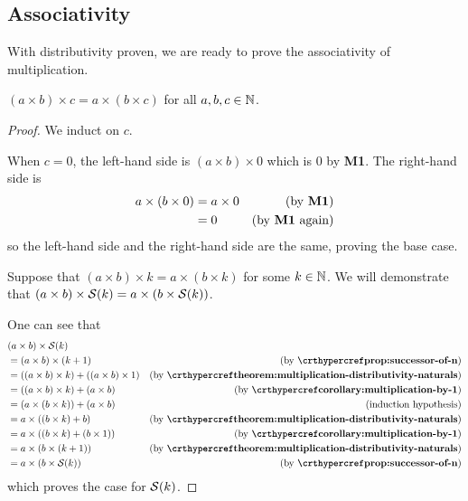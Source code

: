 \subsection{Associativity}
With distributivity proven, we are ready to prove the associativity of multiplication.

\begin{theorem}\label{theorem:multiplication-associative-naturals}
    $(a \times b) \times c = a \times (b \times c)$ for all $a, b, c \in \mathbb{N}$.
\end{theorem}
\begin{proof}
    We induct on $c$.

    When $c = 0$, the left-hand side is $(a \times b) \times 0$ which is 0 by \textbf{M1}. The right-hand side is
    \begin{align*}
        a \times (b \times 0) &= a \times 0 & (\text{by \textbf{M1}})\\
        &= 0  & (\text{by \textbf{M1} again})
    \end{align*}
    so the left-hand side and the right-hand side are the same, proving the base case.

    Suppose that $(a \times b) \times k = a \times (b \times k)$ for some $k \in \mathbb{N}$. We will demonstrate that $(a \times b) \times {\mathcal{S}(k)} = a \times (b \times {\mathcal{S}(k)})$.

    One can see that
    \begin{align*}
        &(a \times b) \times \Successor{k}\\
        &= (a \times b) \times (k + 1) & (\text{by \myref{prop:successor-of-n}})\\
        &= ((a \times b) \times k) + ((a \times b) \times 1) & (\text{by \myref{theorem:multiplication-distributivity-naturals}})\\
        &= ((a \times b) \times k) + (a \times b) & (\text{by \myref{corollary:multiplication-by-1}})\\
        &= (a \times(b \times k)) + (a \times b) & (\text{induction hypothesis})\\
        &= a \times ((b \times k) + b) & (\text{by \myref{theorem:multiplication-distributivity-naturals}})\\
        &= a \times ((b \times k) + (b \times 1)) & (\text{by \myref{corollary:multiplication-by-1}})\\
        &= a \times (b \times (k + 1)) & (\text{by \myref{theorem:multiplication-distributivity-naturals}})\\
        &= a \times (b \times \Successor{k}) & (\text{by \myref{prop:successor-of-n}})
    \end{align*}
    which proves the case for ${\mathcal{S}(k)}$.
\end{proof}


